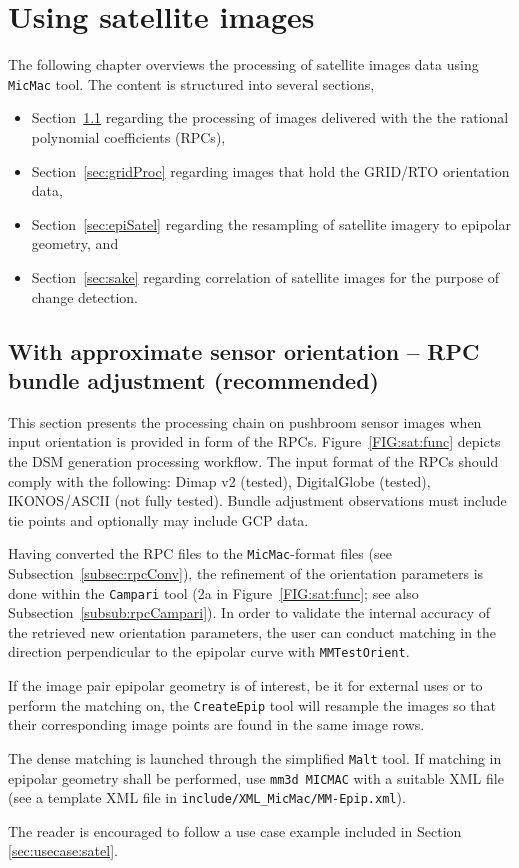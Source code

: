\chapter{Using satellite images}\label{ch:useSat}
%
The following chapter overviews the processing of satellite images data using \texttt{MicMac} tool. The content is structured into several sections, 
\begin{itemize}
\item Section~\ref{sec:rpcBundle} regarding the processing of images delivered with the the rational polynomial coefficients (RPCs),
\item Section~\ref{sec:gridProc} regarding images that hold the GRID/RTO orientation data,
\item Section~\ref{sec:epiSatel} regarding the resampling of satellite imagery to epipolar geometry, and
\item Section~\ref{sec:sake} regarding correlation of satellite images for the purpose of change detection.
\end{itemize}
 
%
\section{With approximate sensor orientation -- RPC bundle adjustment (recommended)}\label{sec:rpcBundle}
This section presents the processing chain on pushbroom sensor images when input orientation is provided in form of the RPCs. Figure~\ref{FIG:sat:func} depicts the DSM generation processing workflow. The input format of the RPCs should comply with the following: Dimap v2 (tested), DigitalGlobe (tested), IKONOS/ASCII (not fully tested). Bundle adjustment observations must include tie points and optionally may include GCP data.\par  
%
Having converted the RPC files to the {\tt MicMac}-format files (see Subsection~\ref{subsec:rpcConv}), the refinement of the orientation parameters is done within the {\tt Campari} tool (2a in Figure~\ref{FIG:sat:func}; see also Subsection~\ref{subsub:rpcCampari}). In order to validate the internal accuracy of the retrieved new orientation parameters, the user can conduct matching in the direction perpendicular to the epipolar curve with {\tt MMTestOrient}.\par 
%
If the image pair epipolar geometry is of interest, be it for external uses or to perform the matching on, the {\tt CreateEpip} tool will resample the images so that their corresponding image points are found in the same image rows.\par 
%
The dense matching is launched through the simplified {\tt Malt} tool. If matching in epipolar geometry shall be performed, use {\tt mm3d MICMAC} with a suitable XML file (see a template XML file in {\tt include/XML\_MicMac/MM-Epip.xml}).\par 
%
The reader is encouraged to follow a use case example included in Section~ \ref{sec:usecase:satel}. 

